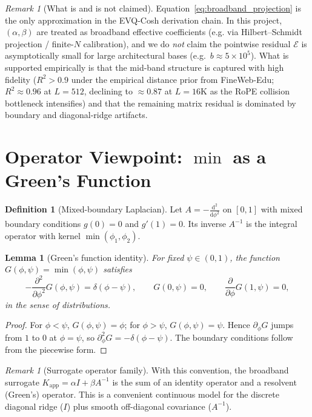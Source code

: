 \documentclass[11pt]{article}
\theoremstyle{plain}
\newtheorem{lemma}[theorem]{Lemma}
\theoremstyle{definition}
\newtheorem{definition}[theorem]{Definition}
\theoremstyle{remark}
\newtheorem{remark}[theorem]{Remark}
\newcommand{\E}{\mathcal{E}}
\begin{document}
\begin{remark}[What is and is not claimed]
Equation~\eqref{eq:broadband_projection} is the only approximation in the EVQ-Cosh
derivation chain. In this project, $(\alpha,\beta)$ are treated as broadband
effective coefficients (e.g. via Hilbert--Schmidt projection / finite-$N$
calibration), and we do \emph{not} claim the pointwise residual $\E$ is
asymptotically small for large architectural bases (e.g.\ $b\approx 5\times10^5$).
What is supported empirically is that the mid-band structure is captured with
high fidelity ($R^2>0.9$ under the empirical distance prior from FineWeb-Edu; $R^2\approx 0.96$ at $L=512$, declining to $\approx 0.87$ at $L=16\mathrm{K}$ as the RoPE collision bottleneck intensifies) and that the remaining matrix
residual is dominated by boundary and diagonal-ridge artifacts.
\end{remark}

\section{Operator Viewpoint: \texorpdfstring{$\min$}{min} as a Green's Function}

\begin{definition}[Mixed-boundary Laplacian]
Let $A=-\frac{\mathrm{d}^2}{\mathrm{d}\phi^2}$ on $[0,1]$ with mixed boundary
conditions $g(0)=0$ and $g'(1)=0$. Its inverse $A^{-1}$ is the integral operator
with kernel $\min(\phi_1,\phi_2)$.
\end{definition}

\begin{lemma}[Green's function identity]
For fixed $\psi\in(0,1)$, the function $G(\phi,\psi)=\min(\phi,\psi)$ satisfies
\begin{equation}
-\frac{\partial^2}{\partial \phi^2}G(\phi,\psi)=\delta(\phi-\psi),\qquad
G(0,\psi)=0,\qquad
\frac{\partial}{\partial\phi}G(1,\psi)=0,
\end{equation}
in the sense of distributions.
\end{lemma}
\begin{proof}
For $\phi<\psi$, $G(\phi,\psi)=\phi$; for $\phi>\psi$, $G(\phi,\psi)=\psi$.
Hence $\partial_\phi G$ jumps from $1$ to $0$ at $\phi=\psi$, so
$\partial_\phi^2 G=-\delta(\phi-\psi)$. The boundary conditions follow from the
piecewise form.
\end{proof}

\begin{remark}[Surrogate operator family]
With this convention, the broadband surrogate
$K_{\mathrm{app}}=\alpha I+\beta A^{-1}$ is the sum of an identity operator and a
resolvent (Green's) operator. This is a convenient continuous model for the
discrete diagonal ridge ($I$) plus smooth off-diagonal covariance ($A^{-1}$).
\end{remark}
\end{document}
